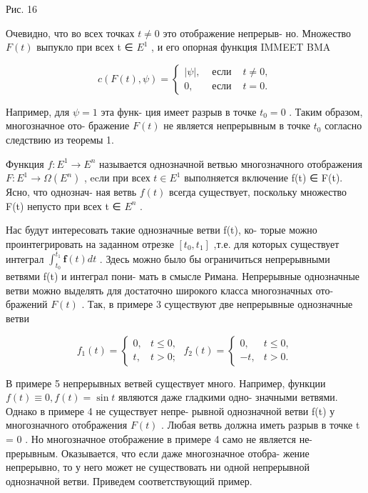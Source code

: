 \documentclass[8pt]{extarticle}
\begin{document}
Рис. 16

Очевидно, что во всех точках \(t \neq  0\) это отображение непрерыв- но. Множество \(F\left( t\right)\) выпукло при всех t ∈ \({E}^{1}\) , и его опорная функция IMMEET BMA

\[
c\left( {F\left( t\right) ,\psi }\right)  = \left\{  \begin{array}{ccc} \left| \psi \right| , & \text{ если } & t \neq  0, \\  0, & \text{ если } & t = 0. \end{array}\right.
\]

Например, для \(\psi  = 1\) эта функ- ция имеет разрыв в точке \({t}_{0} = 0\) . Таким образом, многозначное ото- бражение \(F\left( t\right)\) не является непрерывным в точке \({t}_{0}\) согласно следствию из теоремы 1.

Функция \(f : {E}^{1} \rightarrow  {E}^{n}\) называется однозначной ветвью многозначного отображения \(F : {E}^{1} \rightarrow  \Omega \left( {E}^{n}\right)\) , ecли при всех \(t \in  {E}^{1}\) выполняется включение f(t) ∈ F(t). Ясно, что однознач- ная ветвь \(f\left( t\right)\) всегда существует, поскольку множество F(t) непусто при всех t ∈ \({E}^{n}\) .

Нас будут интересовать такие однозначные ветви f(t), ко- торые можно проинтегрировать на заданном отрезке \(\left\lbrack  {{t}_{0},{t}_{1}}\right\rbrack\) ,т.е. для которых существует интеграл \({\int }_{{t}_{0}}^{{t}_{1}}\mathbf{f}\left( t\right) {dt}\) . Здесь можно было бы ограничиться непрерывными ветвями f(t) и интеграл пони- мать в смысле Римана. Непрерывные однозначные ветви можно выделять для достаточно широкого класса многозначных ото- бражений \(F\left( t\right)\) . Так, в примере 3 существуют две непрерывные однозначные ветви

\[
{f}_{1}\left( t\right)  = \left\{  {\begin{array}{ll} 0, & t \leq  0, \\  t, & t > 0; \end{array}\;{f}_{2}\left( t\right)  = \left\{  \begin{array}{cc} 0, & t \leq  0, \\   - t, & t > 0. \end{array}\right. }\right.
\]

В примере 5 непрерывных ветвей существует много. Например, функции \(f\left( t\right)  \equiv  0,f\left( t\right)  = \sin t\) являются даже гладкими одно- значными ветвями. Однако в примере 4 не существует непре- рывной однозначной ветви f(t) у многозначного отображения \(F\left( t\right)\) . Любая ветвь должна иметь разрыв в точке t = 0 . Но многозначное отображение в примере 4 само не является не- прерывным. Оказывается, что если даже многозначное отобра- жение непрерывно, то у него может не существовать ни одной непрерывной однозначной ветви. Приведем соответствующий пример.
\end{document}
